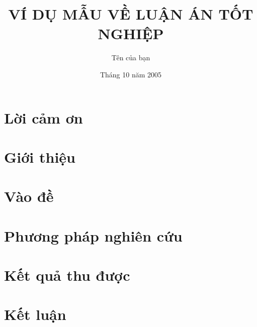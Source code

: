\documentclass[a4paper]{report}
\begin{document}
\title{VÍ DỤ MẪU VỀ LUẬN ÁN TỐT NGHIỆP}
\author{Tên của bạn}
\date{Tháng 10 năm 2005}

\maketitle

\tableofcontents
\listoffigures
\listoftables

\chapter*{Lời cảm ơn}

\begin{abstract}
\end{abstract}


\chapter{Giới thiệu}
\label{ch:gioithieu}

\chapter{Vào đề}
\label{ch:vaode}

\chapter{Phương pháp nghiên cứu}
\label{ch:phuongphap}

\chapter{Kết quả thu được}
\label{ch:ketqua}

\chapter{Kết luận}
\label{ch:ketluan}



\end{document}

